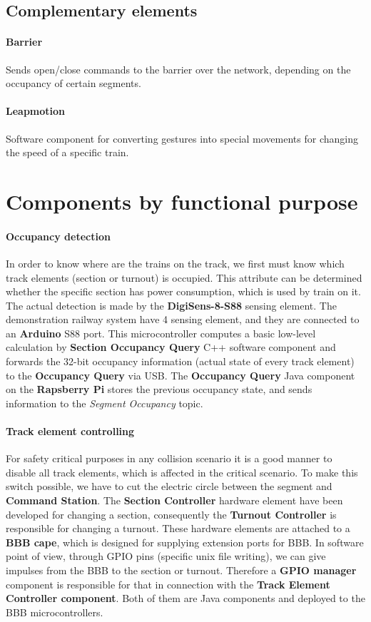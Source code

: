 \subsection{Complementary elements}
\paragraph{Barrier} 
Sends open/close commands to the barrier over the network, depending on the occupancy of certain segments.
\paragraph{Leapmotion}
Software component for converting gestures into special movements for changing the speed of a specific train.

\section{Components by functional purpose}
\paragraph{Occupancy detection}\label{par:FunctionOccupancyDetection}
In order to know where are the trains on the track, we first must know which track elements (section or turnout) is occupied. This attribute can be determined whether the specific section has power consumption, which is used by train on it. The actual detection is made by the\textbf{ DigiSens-8-S88} sensing element. The demonstration railway system have 4 sensing element, and they are connected to an\textbf{ Arduino} S88 port. This microcontroller computes a basic low-level calculation by \textbf{Section Occupancy Query} C++ software component and forwards the 32-bit occupancy information (actual state of every track element) to the \textbf{Occupancy Query} via USB. The\textbf{ Occupancy Query} Java component on the \textbf{Rapsberry Pi} stores the previous occupancy state, and sends information to the \textit{Segment Occupancy} topic.

\paragraph{Track element controlling}\label{par:FunctionTEC}
For safety critical purposes in any collision scenario it is a good manner to disable all track elements, which is affected in the critical scenario. To make this switch possible, we have to cut the electric circle between the segment and \textbf{Command Station}. The \textbf{Section Controller} hardware element have been developed for changing a section, consequently the \textbf{Turnout Controller} is responsible for changing a turnout. These hardware elements are attached to a \textbf{BBB cape}, which is designed for supplying extension ports for BBB. In software point of view, through GPIO pins (specific unix file writing), we can give impulses from the BBB to the section or turnout. Therefore a \textbf{GPIO manager} component is responsible for that in connection with the \textbf{Track Element Controller component}. Both of them are Java components and deployed to the BBB microcontrollers.

